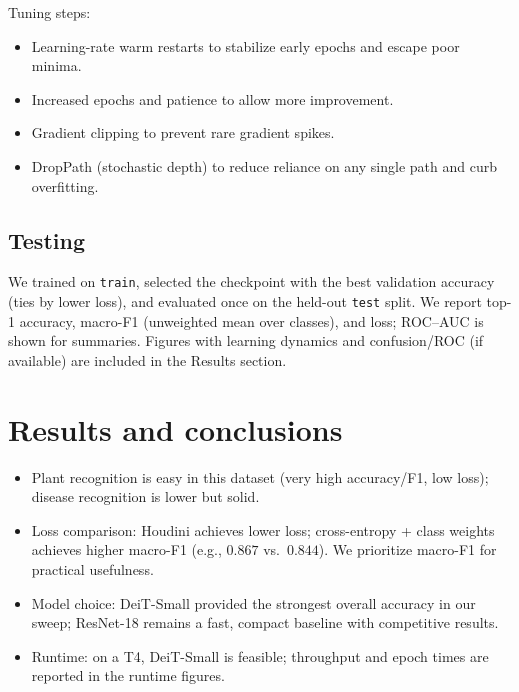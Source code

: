 \documentclass{article}
\begin{document}
Tuning steps:
\begin{itemize}[nosep,leftmargin=*]
  \item Learning-rate warm restarts to stabilize early epochs and escape poor minima.
  \item Increased epochs and patience to allow more improvement.
  \item Gradient clipping to prevent rare gradient spikes.
  \item DropPath (stochastic depth) to reduce reliance on any single path and curb overfitting.
\end{itemize}

\subsection{Testing}
We trained on \texttt{train}, selected the checkpoint with the best validation accuracy (ties by lower loss), and evaluated once on the held-out \texttt{test} split. We report top-1 accuracy, macro-F1 (unweighted mean over classes), and loss; ROC–AUC is shown for summaries. Figures with learning dynamics and confusion/ROC (if available) are included in the Results section.


\section{Results and conclusions}
\begin{itemize}[nosep,leftmargin=*]
  \item Plant recognition is easy in this dataset (very high accuracy/F1, low loss); disease recognition is lower but solid.
  \item Loss comparison: Houdini achieves lower loss; cross-entropy + class weights achieves higher macro-F1 (e.g., $0.867$ vs.\ $0.844$). We prioritize macro-F1 for practical usefulness.
  \item Model choice: DeiT-Small provided the strongest overall accuracy in our sweep; ResNet-18 remains a fast, compact baseline with competitive results.
  \item Runtime: on a T4, DeiT-Small is feasible; throughput and epoch times are reported in the runtime figures.
\end{itemize}
\end{document}
